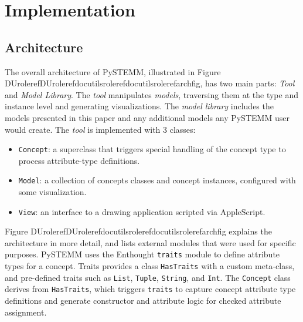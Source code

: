 \documentclass[letterpaper,compsoc,twoside]{IEEEtran}
\providecommand*{\DUrole}[2]{\ifcsname DUrole#1\endcsname \csname DUrole#1\endcsname{#2}\else \ifcsname docutilsrole#1\endcsname \csname docutilsrole#1\endcsname{#2}\else #2\fi \fi }
\begin{document}
\section{Implementation\label{implementation}}


\subsection{Architecture\label{architecture}}
The overall architecture of PySTEMM, illustrated in Figure \DUrole{ref}{archfig}, has two main parts: \emph{Tool} and \emph{Model Library}. The \emph{tool} manipulates \emph{models}, traversing them at the type and instance level and generating visualizations. The \emph{model library} includes the models presented in this paper and any additional models any PySTEMM user would create. The \emph{tool} is implemented with 3 classes:\begin{itemize}

\item 

\texttt{Concept}: a superclass that triggers special handling of the concept type to process attribute-type definitions.
\item 

\texttt{Model}: a collection of concepts classes and concept instances, configured with some visualization.
\item 

\texttt{View}: an interface to a drawing application scripted via AppleScript.
\end{itemize}


Figure \DUrole{ref}{archfig} explains the architecture in more detail, and lists external modules that were used for specific purposes. PySTEMM uses the Enthought \texttt{traits} module \cite{Tra14} to define attribute types for a concept. Traits provides a class \texttt{HasTraits} with a custom meta-class, and pre-defined traits such as \texttt{List}, \texttt{Tuple}, \texttt{String}, and \texttt{Int}. The \texttt{Concept} class derives from \texttt{HasTraits}, which triggers \texttt{traits} to capture concept attribute type definitions and generate constructor and attribute logic for checked attribute assignment.
\begin{figure*}[]\noindent{}
\caption{Architecture of PySTEMM. \DUrole{label}{archfig}}
\end{figure*}
\end{document}
